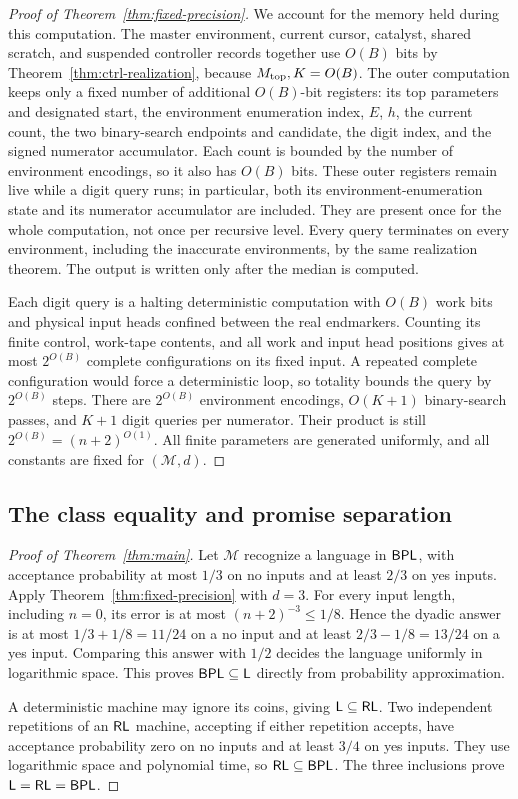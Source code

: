\begin{proof}[Proof of Theorem~\ref{thm:fixed-precision}]
We account for the memory held during this computation. The master
environment, current cursor, catalyst, shared scratch, and suspended
controller records together use $O(B)$ bits by
Theorem~\ref{thm:ctrl-realization}, because $M_{\rm top},K=O(B)$.
The outer computation keeps only a fixed number of additional
$O(B)$-bit registers: its top parameters and designated start,
the environment enumeration index, $E$, $h$, the current count,
the two binary-search endpoints and candidate, the digit index,
and the signed numerator accumulator. Each count is bounded by the
number of environment encodings, so it also has $O(B)$ bits.
These outer registers remain live while a digit query runs; in
particular, both its environment-enumeration state and its numerator
accumulator are included. They are present once for the whole
computation, not once per recursive level. Every query terminates on every environment,
including the inaccurate environments, by the same realization
theorem. The output is written only after the median is computed.

Each digit query is a halting deterministic computation with $O(B)$
work bits and physical input heads confined between the real endmarkers.
Counting its finite control, work-tape contents, and all work and input
head positions gives at most $2^{O(B)}$ complete configurations on its
fixed input. A repeated complete configuration would
force a deterministic loop, so totality bounds the query by
$2^{O(B)}$ steps. There are
$2^{O(B)}$ environment encodings, $O(K+1)$ binary-search passes,
and $K+1$ digit queries per numerator. Their product is still
$2^{O(B)}=(n+2)^{O(1)}$. All finite parameters are generated
uniformly, and all constants are fixed for $(\mathcal M,d)$.
\end{proof}

\subsection{The class equality and promise separation}

\begin{proof}[Proof of Theorem~\ref{thm:main}]
Let $\mathcal M$ recognize a language in $\mathsf{BPL}$, with acceptance
probability at most $1/3$ on no inputs and at least $2/3$ on yes
inputs. Apply Theorem~\ref{thm:fixed-precision} with $d=3$.
For every input length, including $n=0$, its error is at most
$(n+2)^{-3}\le1/8$. Hence the dyadic answer is at most
$1/3+1/8=11/24$ on a no input and at least
$2/3-1/8=13/24$ on a yes input. Comparing this answer with $1/2$
decides the language uniformly in logarithmic space. This proves
$\mathsf{BPL}\subseteq\mathsf L$ directly from probability approximation.

A deterministic machine may ignore its coins, giving
$\mathsf L\subseteq\mathsf{RL}$. Two independent repetitions of an $\mathsf{RL}$
machine, accepting if either repetition accepts, have acceptance
probability zero on no inputs and at least $3/4$ on yes inputs.
They use logarithmic space and polynomial time, so
$\mathsf{RL}\subseteq\mathsf{BPL}$. The three inclusions prove
$\mathsf L=\mathsf{RL}=\mathsf{BPL}$.
\end{proof}

